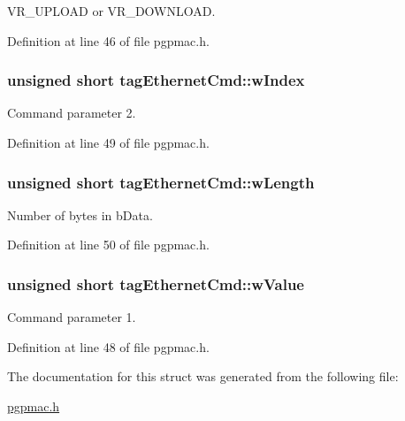V\-R\-\_\-\-U\-P\-L\-O\-A\-D or V\-R\-\_\-\-D\-O\-W\-N\-L\-O\-A\-D. 



Definition at line 46 of file pgpmac.\-h.

\hypertarget{structtagEthernetCmd_a92f5a374e87d4f496b64b4888850d6e6}{
\subsubsection[{w\-Index}]{\setlength{\rightskip}{0pt plus 5cm}unsigned short tag\-Ethernet\-Cmd\-::w\-Index}}\label{structtagEthernetCmd_a92f5a374e87d4f496b64b4888850d6e6}


Command parameter 2. 



Definition at line 49 of file pgpmac.\-h.

\hypertarget{structtagEthernetCmd_af5df25ff13ca30fa33719d0df1ab7e97}{
\subsubsection[{w\-Length}]{\setlength{\rightskip}{0pt plus 5cm}unsigned short tag\-Ethernet\-Cmd\-::w\-Length}}\label{structtagEthernetCmd_af5df25ff13ca30fa33719d0df1ab7e97}


Number of bytes in b\-Data. 



Definition at line 50 of file pgpmac.\-h.

\hypertarget{structtagEthernetCmd_aec0ee9a5f6c7e3bc6e4bd98f1bd52783}{
\subsubsection[{w\-Value}]{\setlength{\rightskip}{0pt plus 5cm}unsigned short tag\-Ethernet\-Cmd\-::w\-Value}}\label{structtagEthernetCmd_aec0ee9a5f6c7e3bc6e4bd98f1bd52783}


Command parameter 1. 



Definition at line 48 of file pgpmac.\-h.



The documentation for this struct was generated from the following file\-:\begin{DoxyCompactItemize}
\item 
\hyperlink{pgpmac_8h}{pgpmac.\-h}\end{DoxyCompactItemize}
